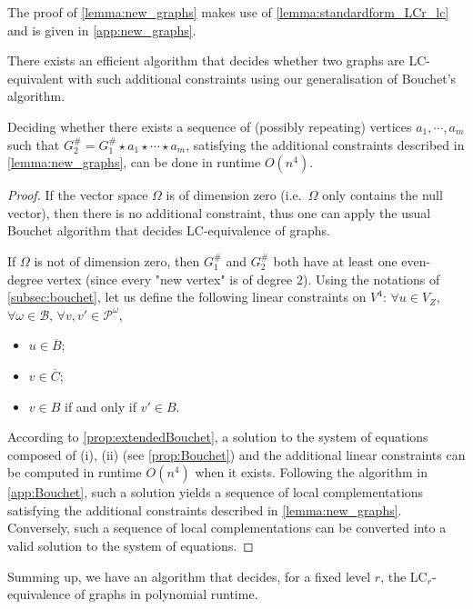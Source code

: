 \documentclass[a4paper,UKenglish,cleveref,autoref,thm-restate]{arxiv}
\begin{document}
The proof of \cref{lemma:new_graphs} makes use of \cref{lemma:standardform_LCr_lc} and is given in \cref{app:new_graphs}. 

There exists an efficient algorithm that decides whether two graphs are LC-equivalent with such additional constraints using our generalisation of Bouchet's algorithm.

\begin{lemma} \label{lemma:LC_new_graphs}
    Deciding whether there exists a sequence of (possibly repeating) vertices $a_1, \cdots, a_m$ such that $G^{\#}_2 = G^{\#}_1 \star a_1 \star \cdots \star a_m$, satisfying the additional constraints described in \cref{lemma:new_graphs}, can be done in runtime $O(n^4)$.
\end{lemma}

\begin{proof}
    If the vector space $\Omega$ is of dimension zero (i.e.~$\Omega$ only contains the null vector), then there is no additional constraint, thus one can apply the usual Bouchet algorithm that decides LC-equivalence of graphs.

    If $\Omega$ is not of dimension zero, then $G^{\#}_1$ and $G^{\#}_2$ both have at least one even-degree vertex (since every "new vertex" is of degree 2). Using the notations of \cref{subsec:bouchet}, let us define the following linear constraints on $V^4$:  $\forall u \in V_Z$, $\forall \omega \in \mathcal B$, $\forall v,v'\in \mathcal P^{\omega}$, 
    \begin{itemize}
        \item $ u \in \overline B$;
        \item $v \in \overline C$;
        \item $v \in B$ if and only if $v' \in B$.
    \end{itemize} 
    According to \cref{prop:extendedBouchet}, a solution to the system of equations composed of (i), (ii) (see \cref{prop:Bouchet}) and the additional linear constraints can be computed in runtime $O(n^4)$ when it exists. Following the algorithm in \cref{app:Bouchet}, such a solution yields a sequence of local complementations satisfying the additional constraints described in \cref{lemma:new_graphs}. Conversely, such a sequence of local complementations can be converted into a valid solution to the system of equations.
\end{proof}

Summing up, we have an algorithm that decides, for a fixed level $r$,  the LC$_r$-equivalence of graphs in polynomial runtime.
\end{document}
